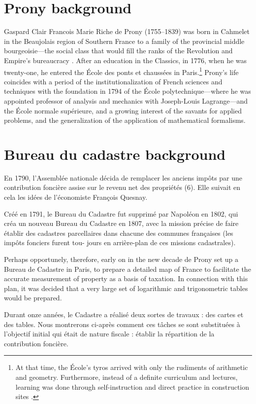 \documentclass[version=last,draft=true,paper=A4,portrait,twoside=true,twocolumn=false,headinclude=false,footinclude=false,fontsize=12,BCOR=20mm,DIV=calc,pagesize=auto,titlepage=firstiscover,mpinclude=true,open=right,chapterprefix=true,numbers=autoendperiod,headsepline=false,headings=twolinechapter,parskip=false]{scrbook}
\begin{document}
\section{Prony background}
\label{sec:org903147d}
Gaspard Clair Francois Marie Riche de Prony (1755--1839) was born in
Cahmelet in the Beaujolais region of Southern France to a family of the
provincial middle bourgeoisie---the social class that would fill the ranks
of the Revolution and Empire's bureaucracy \cite{picon_et_al1984}. After an
education in the Classics, in 1776, when he was twenty-one, he entered the
École des ponts et chaussées in Paris.\footnote{At that time, the École's tyros arrived with only the rudiments of
arithmetic and geometry. Furthermore, instead of a definite curriculum and
lectures, learning was done through self-instruction and direct practice in
construction sites \cite{picon_et_al1984}.} Prony's life coincides with a
period of the institutionalization of French sciences and techniques with
the foundation in 1794 of the École polytechnique---where he was appointed
professor of analysis and mechanics with Joseph-Louis Lagrange---and the
École normale supérieure, and a growing interest of the savants for applied
problems, and the generalization of the application of mathematical
formalisms.
\section{Bureau du cadastre background}
\label{sec:org2662171}

En 1790, l’Assemblée nationale décida de remplacer les anciens impôts par
une contribution foncière assise sur le revenu net des propriétés (6). Elle
suivait en cela les idées de l’économiste François Quesnay.

Créé en 1791, le Bureau du Cadastre fut supprimé par Napoléon en 1802, qui
créa un nouveau Bureau du Cadastre en 1807, avec la mission précise de
faire établir des cadastres parcellaires dans chacune des communes
françaises (les impôts fonciers furent tou- jours en arrière-plan de ces
missions cadastrales). 

Perhaps opportunely, therefore, early on in the new decade de Prony set up
a Bureau de Cadastre in Paris, to prepare a detailed map of France to
facilitate the accurate measurement of property as a basis of taxation. In
connection with this plan, it was decided that a very large set of
logarithmic and trigonometric tables would be prepared. 

Durant onze années, le Cadastre a réalisé deux sortes de travaux : des
cartes et des tables. Nous montrerons ci-après comment ces tâches se sont
substituées à l’objectif initial qui était de nature fiscale : établir la
répartition de la contribution foncière. 
\end{document}
